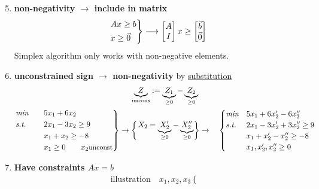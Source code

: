 \begin{enumerate}
	\setcounter{enumi}{4}
	\item \textbf{non-negativity $\rightarrow$ include in matrix}
	\begin{gather*}
		\begin{rcases}
		Ax \geq b\\
		x \geq \vec{0}	
		\end{rcases} \longrightarrow 
		\begin{bmatrix}
			A\\I
		\end{bmatrix} x \geq \begin{bmatrix}
			\vec{b}\\ \vec{0}
		\end{bmatrix}
	\end{gather*}
	Simplex algorithm only works with non-negative elements.
	\item \textbf{unconstrained sign $\rightarrow$ non-negativity}
	by \underline{substitution} 
	\begin{gather*}
		\underbrace{Z}_{\text{uncons}} := \underbrace{Z_1}_{\geq 0} - \underbrace{Z_2}_{\geq 0}\\
		\begin{rcases}
			\textit{min} \quad & 5x_1 + 6x_2\\
		\textit{s.t.} \quad & 2x_1 - 3x_2 \geq 9\\
		& x_1 + x_2 \geq -8\\
		& x_1 \geq 0 \qquad x_2 \text{\small unconst}
		\end{rcases} \rightarrow 
		\begin{cases}
			\begin{rcases}
			X_2 =\underbrace{X_2'}_{\geq 0}	 - \underbrace{X_2''}_{\geq 0}
			\end{rcases} \rightarrow
		\end{cases}
		\begin{cases}
			\textit{min} & 5x_1 + 6x_2' - 6x_2''\\
			\textit{s.t.} & 2x_1 - 3x_2' + 3x_2'' \geq 9\\
		& x_1 + x_2' - x_2'' \geq -8\\
		& x_1, x_2', x_2'' \geq 0
		\end{cases}
	\end{gather*}
	\item \textbf{Have constraints $Ax=b$}
	\begin{gather*}
		\text{illustration} \quad x_1, x_2, x_3 \begin{cases}

\end{cases}
\end{gather*}
\end{enumerate}
